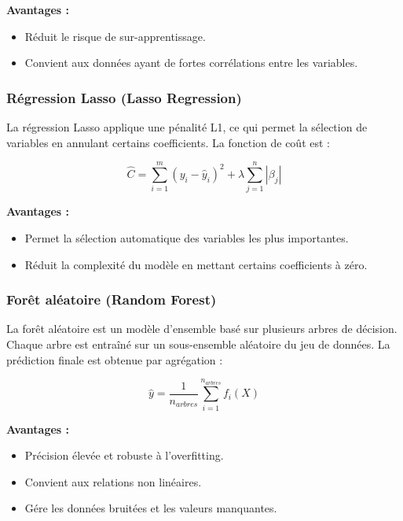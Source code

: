 \textbf{Avantages :}
\begin{itemize}
	\item R\'eduit le risque de sur-apprentissage.
	\item Convient aux donn\'ees ayant de fortes corr\'elations entre les variables.
\end{itemize}

\subsubsection{R\'egression Lasso (Lasso Regression)}

La r\'egression Lasso applique une p\'enalit\'e L1, ce qui permet la s\'election de variables en annulant certains coefficients. La fonction de co\^ut est :


\begin{equation}
\hat{C} = \sum_{i=1}^{m} (y_i - \hat{y}_i)^2 + \lambda \sum_{j=1}^{n} |\beta_j|
\end{equation}

\textbf{Avantages :}
\begin{itemize}
	\item Permet la s\'election automatique des variables les plus importantes.
	\item R\'eduit la complexit\'e du mod\`ele en mettant certains coefficients \`a z\'ero.
\end{itemize}

\subsubsection{For\^et al\'eatoire (Random Forest)}

La for\^et al\'eatoire est un mod\`ele d'ensemble bas\'e sur plusieurs arbres de d\'ecision. Chaque arbre est entra\^in\'e sur un sous-ensemble al\'eatoire du jeu de donn\'ees. La pr\'ediction finale est obtenue par agr\'egation :



\begin{equation}
\hat{y} = \frac{1}{n_{arbres}} \sum_{i=1}^{n_{arbres}} f_i(X)
\end{equation}

\textbf{Avantages :}
\begin{itemize}
	\item Pr\'ecision \'elev\'ee et robuste \`a l'overfitting.
	\item Convient aux relations non lin\'eaires.
	\item G\'ere les donn\'ees bruit\'ees et les valeurs manquantes.
\end{itemize}

